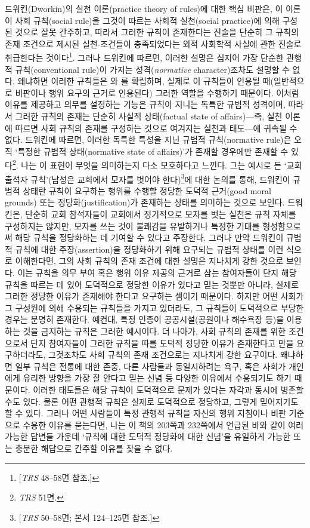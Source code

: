 드워킨(Dworkin)의 실천 이론(practice theory of rules)에 대한 핵심
비판은, 이 이론이 사회 규칙(social rule)을 그것이 따르는 사회적
실천(social practice)에 의해 구성된 것으로 잘못 간주하고, 따라서 그러한
규칙이 존재한다는 진술을 단순히 그 규칙의 존재 조건으로 제시된
실천-조건들이 충족되었다는 외적 사회학적 사실에 관한 진술로 취급한다는
것이다\footnote{{[}\emph{TRS} 48--58면 참조.{]}}. 그러나 드워킨에
따르면, 이러한 설명은 심지어 가장 단순한 관행적 규칙(conventional
rule)이 가지는  성격(\emph{normative} character)조차도
설명할 수 없다. 왜냐하면 이러한 규칙들은 와
를 확립하며, 실제로 이
규칙들이 인용될 때(일반적으로 비판이나 행위 요구의 근거로 인용된다)
그러한 역할을 수행하기 때문이다. 이처럼 이유를 제공하고 의무를 설정하는
기능은 규칙이 지니는 독특한 규범적 성격이며, 따라서 그러한 규칙의 존재는
단순히 사실적 상태(factual state of affairs)---즉, 실천 이론에 따르면
사회 규칙의 존재를 구성하는 것으로 여겨지는 실천과 태도---에 귀속될 수
없다. 드워킨에 따르면, 이러한 독특한 특성을 지닌 규범적 규칙(normative
rule)은 오직 `특정한 규범적 상태(normative state of affairs)'가 존재할
경우에만 존재할 수 있다\footnote{\emph{TRS} 51면.}. 나는 이 표현이
무엇을 의미하는지 다소 모호하다고 느낀다. 그는 예시로 든 `교회 출석자
규칙'(남성은 교회에서 모자를 벗어야 한다)\footnote{{[}\emph{TRS}
  50--58면; 본서 124--125면 참조.{]}}에 대한 논의를 통해, 드워킨이
규범적 상태란 규칙이 요구하는 행위를 수행할 정당한 도덕적 근거(good
moral grounds) 또는 정당화(justification)가 존재하는 상태를 의미하는
것으로 보인다. 드워킨은, 단순히 교회 참석자들이 교회에서 정기적으로
모자를 벗는 실천은 규칙 자체를 구성하지는 않지만, 모자를 쓰는 것이
불쾌감을 유발하거나 특정한 기대를 형성함으로써 해당 규칙을 정당화하는 데
기여할 수 있다고 주장한다. 그러나 만약 드워킨이 규범적 규칙에 대한
주장(assertion)을 정당화하기 위해 요구되는 규범적 상태를 이런 식으로
이해한다면, 그의 사회 규칙의 존재 조건에 대한 설명은 지나치게 강한
것으로 보인다. 이는 규칙을 의무 부여 혹은 행위 이유 제공의 근거로 삼는
참여자들이 단지 해당 규칙을 따르는 데 있어 도덕적으로 정당한 이유가
있다고 믿는 것뿐만 아니라, 실제로 그러한 정당한 이유가 존재해야 한다고
요구하는 셈이기 때문이다. 하지만 어떤 사회가 그 구성원에 의해 수용되는
규칙들을 가지고 있더라도, 그 규칙들이 도덕적으로 부당한 경우는 분명히
존재한다. 예컨대, 특정 인종이 공공시설(공원이나 해수욕장 등)을 이용하는
것을 금지하는 규칙은 그러한 예시이다. 더 나아가, 사회 규칙의 존재를 위한
조건으로서 단지 참여자들이 그러한 규칙을 따를 도덕적 정당한 이유가
존재한다고 만을 요구하더라도, 그것조차도 사회
규칙의 존재 조건으로는 지나치게 강한 요구이다. 왜냐하면 일부 규칙은
전통에 대한 존중, 다른 사람들과 동일시하려는 욕구, 혹은 사회가 개인에게
유리한 방향을 가장 잘 안다고 믿는 신념 등 다양한 이유에서 수용되기도
하기 때문이다. 이러한 태도들은 해당 규칙이 도덕적으로 문제가 있다는
자각과 동시에 병존할 수도 있다. 물론 어떤 관행적 규칙은 실제로
도덕적으로 정당하고, 그렇게 믿어지기도 할 수 있다. 그러나 어떤 사람들이
특정 관행적 규칙을 자신의 행위 지침이나 비판 기준으로 수용한 이유를
묻는다면, 나는 이 책의 203쪽과 232쪽에서 언급된 바와 같이 여러 가능한
답변들 가운데 `규칙에 대한 도덕적 정당화에 대한 신념'을 유일하게 가능한
또는 충분한 해답으로 간주할 이유를 찾을 수 없다.

